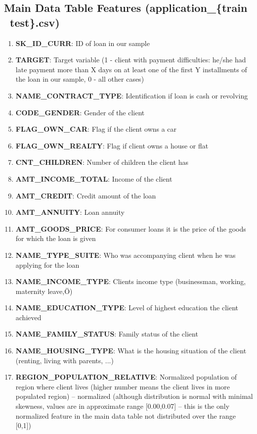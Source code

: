 \documentclass[12pt, letterpaper]{article}
\begin{document}
\begin{appendices}
\subsection{Main Data Table Features (application_\{train \textbar~test\}.csv)}
\begin{enumerate}
  \item \textbf{SK_ID_CURR}: ID of loan in our sample
  \item \textbf{TARGET}: Target variable (1 - client with payment difficulties: he/she had late payment more than X days on at least one of the first Y installments of the loan in our sample, 0 - all other cases)
  \item \textbf{NAME_CONTRACT_TYPE}: Identification if loan is cash or revolving
  \item \textbf{CODE_GENDER}: Gender of the client
  \item \textbf{FLAG_OWN_CAR}: Flag if the client owns a car
  \item \textbf{FLAG_OWN_REALTY}: Flag if client owns a house or flat
  \item \textbf{CNT_CHILDREN}: Number of children the client has
  \item \textbf{AMT_INCOME_TOTAL}: Income of the client
  \item \textbf{AMT_CREDIT}: Credit amount of the loan
  \item \textbf{AMT_ANNUITY}: Loan annuity
  \item \textbf{AMT_GOODS_PRICE}: For consumer loans it is the price of the goods for which the loan is given
  \item \textbf{NAME_TYPE_SUITE}: Who was accompanying client when he was applying for the loan
  \item \textbf{NAME_INCOME_TYPE}: Clients income type (businessman, working, maternity leave,Ö)
  \item \textbf{NAME_EDUCATION_TYPE}: Level of highest education the client achieved
  \item \textbf{NAME_FAMILY_STATUS}: Family status of the client
  \item \textbf{NAME_HOUSING_TYPE}: What is the housing situation of the client (renting, living with parents, ...)
  \item \textbf{REGION_POPULATION_RELATIVE}: Normalized population of region where client lives (higher number means the client lives in more populated region) -- normalized (although distribution is normal with minimal skewness, values are in approximate range [0.00,0.07] -- this is the only normalized feature in the main data table not distributed over the range [0,1])

\end{enumerate}
\end{appendices}
\end{document}
